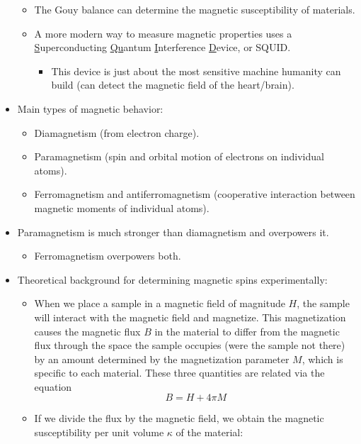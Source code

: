 \documentclass[../notes.tex]{subfiles}
\begin{document}
\begin{itemize}
\begin{itemize}
        \item The Gouy balance can determine the magnetic susceptibility of materials.
        \item A more modern way to measure magnetic properties uses a \underline{S}uperconducting \underline{Qu}antum \underline{I}nterference \underline{D}evice, or SQUID.
        \begin{itemize}
            \item This device is just about the most sensitive machine humanity can build (can detect the magnetic field of the heart/brain).
        \end{itemize}
    \end{itemize}
    \item Main types of magnetic behavior:
    \begin{itemize}
        \item Diamagnetism (from electron charge).
        \item Paramagnetism (spin and orbital motion of electrons on individual atoms).
        \item Ferromagnetism and antiferromagnetism (cooperative interaction between magnetic moments of individual atoms).
    \end{itemize}
    \item Paramagnetism is much stronger than diamagnetism and overpowers it.
    \begin{itemize}
        \item Ferromagnetism overpowers both.
    \end{itemize}
    \item Theoretical background for determining magnetic spins experimentally:
    \begin{itemize}
        \item When we place a sample in a magnetic field of magnitude $H$, the sample will interact with the magnetic field and magnetize. This magnetization causes the magnetic flux $B$ in the material to differ from the magnetic flux through the space the sample occupies (were the sample not there) by an amount determined by the magnetization parameter $M$, which is specific to each material. These three quantities are related via the equation
        \begin{equation*}
            B = H+4\pi M
        \end{equation*}
        \item If we divide the flux by the magnetic field, we obtain the magnetic susceptibility per unit volume $\kappa$ of the material:

\end{itemize}
\end{itemize}
\end{document}
